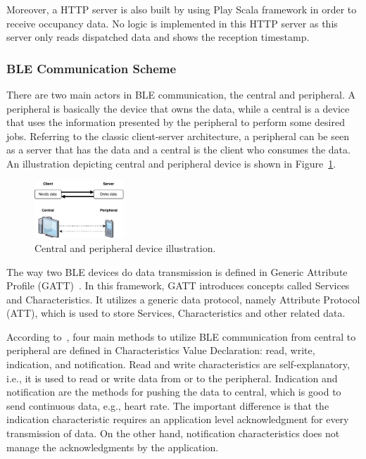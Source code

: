 \documentclass[journal]{vgtc}                %
\begin{document}
Moreover, a HTTP server is also built by using Play Scala framework in order to receive occupancy data. No logic is implemented in this HTTP server as this server only reads dispatched data and shows the reception timestamp.



\subsubsection{BLE Communication Scheme} %
\label{ssub:ble_communication_scheme}
There are two main actors in BLE communication, the central and peripheral.  A peripheral is basically the device that owns the data, while a central is a device that uses the information presented by the peripheral to perform some desired jobs. Referring to the classic client-server architecture, a peripheral can be seen as a server that has the data and a central is the client who consumes the data. An illustration depicting central and peripheral device is shown in Figure~\ref{fig:central-peripheral}.

\begin{figure}
  \centering
    \includegraphics[width=0.3\textwidth]{central-peripheral}
  \caption{Central and peripheral device illustration.}
  \label{fig:central-peripheral}
\end{figure}

The way two BLE devices do data transmission is defined in Generic Attribute Profile (GATT)~\cite{BluetoothSpecialInterestGroup2014}. In this framework, GATT introduces concepts called Services and Characteristics. It utilizes a generic data protocol, namely Attribute Protocol (ATT), which is used to store Services, Characteristics and other related data.

According to~\cite{BluetoothSpecialInterestGroup2014}, four main methods to utilize BLE communication from central to peripheral are defined in Characteristics Value Declaration: read, write, indication, and notification. Read and write characteristics are self-explanatory, i.e., it is used to read or write data from or to the peripheral. Indication and notification are the methods for pushing the data to central, which is good to send continuous data, e.g., heart rate. The important difference is that the indication characteristic requires an application level acknowledgment for every transmission of data. On the other hand, notification characteristics does not manage the acknowledgments by the application.
\end{document}
